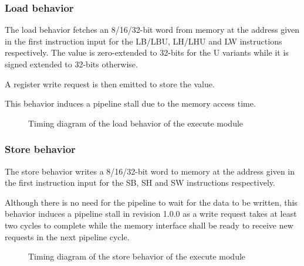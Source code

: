       

    \subsubsection{Load behavior}

      \begin{content}
          The load behavior fetches an 8/16/32-bit word from memory at the address given in the first instruction input for the LB/LBU, LH/LHU and LW instructions respectively. The value is zero-extended to 32-bits for the U variants while it is signed extended to 32-bits otherwise. 
          
          A register write request is then emitted to store the value. 
          
          This behavior induces a pipeline stall due to the memory access time.
        \end{content}

      \begin{figure}[H]
          \centering
          
          \caption{Timing diagram of the load behavior of the execute module}
          \label{fig:exm-behavior-load}
        \end{figure}

      

    \subsubsection{Store behavior}

      \begin{content}
          The store behavior writes a 8/16/32-bit word to memory at the address given in the first instruction input for the SB, SH and SW instructions respectively.

          Although there is no need for the pipeline to wait for the data to be written, this behavior induces a pipeline stall in revision 1.0.0 as a write request takes at least two cycles to complete while the memory interface shall be ready to receive new requests in the next pipeline cycle.
        \end{content}

      \begin{figure}[H]
          \centering
          
          \caption{Timing diagram of the store behavior of the execute module}
          \label{fig:exm-behavior-store}
        \end{figure}

